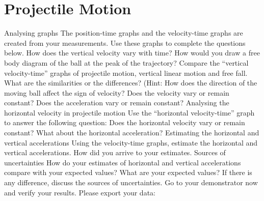 \documentclass{article}
\begin{document}
\section{Projectile Motion}
	Analysing graphs
	The position-time graphs and the velocity-time graphs are created from your
measurements. Use these graphs to complete the questions below.
	How does the vertical velocity vary with time?
	How would you draw a free body diagram of the ball at the peak of the
trajectory?
	Compare the “vertical velocity-time” graphs of projectile motion, vertical
linear motion and free fall. What are the similarities or the differences?
(Hint: How does the direction of the moving ball affect the sign of velocity?
Does the velocity vary or remain constant? Does the acceleration vary or remain
constant?
	Analysing the horizontal velocity in projectile motion
	Use the “horizontal velocity-time” graph to answer the following question:
	Does the horizontal velocity vary or remain constant?  What about the
horizontal acceleration?
	Estimating the horizontal and vertical accelerations
	Using the velocity-time graphs, estimate the horizontal and vertical
accelerations. How did you arrive to your estimates.
	Sources of uncertainties
	How do your estimates of horizontal and vertical accelerations compare with
your expected values? What are your expected values?  If there is any
difference, discuss the sources of uncertainties.
	Go to your demonstrator now and verify your results.
	Please export your data:
\end{document}
